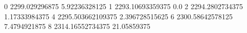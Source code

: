 0 2299.029296875 5.92236328125
1 2293.10693359375 0.0
2 2294.2802734375 1.17333984375
4 2295.503662109375 2.396728515625
6 2300.58642578125 7.4794921875
8 2314.16552734375 21.05859375
